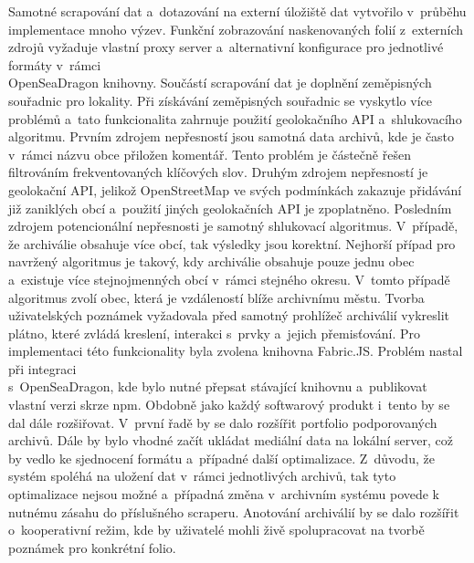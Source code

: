 \newpara
Samotné scrapování dat a~dotazování na externí úložiště dat vytvořilo v~průběhu implementace mnoho výzev. Funkční zobrazování naskenovaných folií z~externích zdrojů vyžaduje vlastní proxy server a~alternativní konfigurace pro jednotlivé formáty v~rámci \\OpenSeaDragon knihovny.
\newpara
Součástí scrapování dat je doplnění zeměpisných souřadnic pro lokality. Při získávání zeměpisných souřadnic se vyskytlo více problémů a~tato funkcionalita zahrnuje použití geolokačního API a~shlukovacího algoritmu. Prvním zdrojem nepřesností jsou samotná data archivů, kde je často v~rámci názvu obce přiložen komentář. Tento problém je částečně řešen filtrováním frekventovaných klíčových slov. Druhým zdrojem nepřesností je geolokační API, jelikož OpenStreetMap ve svých podmínkách zakazuje přidávání již zaniklých obcí a~použití jiných geolokačních API je zpoplatněno. Posledním zdrojem potencionální nepřesnosti je samotný shlukovací algoritmus. V~případě, že archiválie obsahuje více obcí, tak výsledky jsou korektní. Nejhorší případ pro navržený algoritmus je takový, kdy archiválie obsahuje pouze jednu obec a~existuje více stejnojmenných obcí v~rámci stejného okresu. V~tomto případě algoritmus zvolí obec, která je vzdáleností blíže archivnímu městu.
\newpara
Tvorba uživatelských poznámek vyžadovala před samotný prohlížeč archiválií vykreslit plátno, které zvládá kreslení, interakci s~prvky a~jejich přemisťování. Pro implementaci této funkcionality byla zvolena knihovna Fabric.JS. Problém nastal při integraci \\s~OpenSeaDragon, kde bylo nutné přepsat stávající knihovnu a~publikovat vlastní verzi skrze npm.
\newpara
Obdobně jako každý softwarový produkt i~tento by se dal dále rozšiřovat. V~první řadě by se dalo rozšířit portfolio podporovaných archivů. Dále by bylo vhodné začít ukládat mediální data na lokální server, což by vedlo ke sjednocení formátu a~případné další optimalizace. Z~důvodu, že systém spoléhá na uložení dat v~rámci jednotlivých archivů, tak tyto optimalizace nejsou možné a~případná změna v~archivním systému povede k nutnému zásahu do příslušného scraperu. Anotování archiválií by se dalo rozšířit o~kooperativní režim, kde by uživatelé mohli živě spolupracovat na tvorbě poznámek pro konkrétní folio.